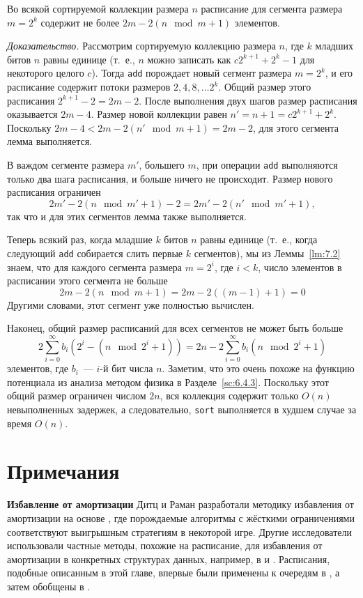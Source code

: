 \begin{lemma}\label{lm:7.2}
  Во всякой сортируемой коллекции размера $n$ расписание для сегмента
  размера $m = 2^k$ содержит не более $2m - 2(n \mod m + 1)$ элементов.

  \emph{Доказательство.} Рассмотрим сортируемую коллекцию размера $n$,
где $k$ младших битов $n$ равны единице (т.~е., $n$ можно записать как
$c2^{k+1} + 2^k -1$ для некоторого целого $c$). Тогда \lstinline!add!
порождает новый сегмент размера $m = 2^k$, и его расписание содержит
потоки размеров $2, 4, 8, \ldots 2^k$. Общий размер этого расписания
$2^{k+1} - 2 = 2m - 2$. После выполнения двух шагов размер расписания
оказывается $2m - 4$. Размер новой коллекции равен $n' = n + 1 =
c2^{k+1} + 2^k$. Поскольку $2m - 4  < 2m - 2(n' \mod m + 1) = 2m - 2$,
для этого сегмента лемма выполняется.

В важдом сегменте размера $m'$, большего $m$, при операции
\lstinline!add! выполняются только два шага
расписания, и больше ничего не происходит. Размер нового расписания
ограничен
$$
2m' - 2(n \mod m' + 1) - 2 = 2m' - 2(n' \mod m' + 1),
$$
так что и для этих сегментов лемма также выполняется.
\end{lemma}

Теперь всякий раз, когда младшие $k$ битов $n$ равны единице (т.~е.,
когда следующий \lstinline!add! собирается слить первые $k$
сегментов), мы из Леммы~\ref{lm:7.2} знаем, что для каждого сегмента
размера $m = 2^i$, где $i < k$, число элементов в расписании этого
сегмента не больше
$$
2m -2(n \mod m + 1) = 2m - 2((m-1) + 1) = 0
$$
Другими словами, этот сегмент уже полностью вычислен.

Наконец, общий размер расписаний для всех сегментов не может быть
больше
$$
2 \sum_{i=0}^\infty b_i(2^i - (n \mod 2^i + 1)) = 2n - 2 \sum_{i=0}^\infty b_i (n \mod 2^i + 1)
$$
элементов, где $b_i$~--- $i$-й бит числа $n$. Заметим, что это очень
похоже на функцию потенциала из анализа методом физика в
Разделе~\ref{sc:6.4.3}. Поскольку этот общий размер ограничен числом
$2n$, вся коллекция содержит только $O(n)$ невыполненных задержек, а
следовательно, \lstinline!sort! выполняется в худшем случае за время
$O(n)$.

\section{Примечания}
\label{sc:7.5}

\noindent
\textbf{Избавление от амортизации}
Дитц и Раман \cite{DietzRaman1991, DietzRaman1993, Raman1995}
разработали методику избавления от амортизации на основе
, где порождаемые алгоритмы с
жёсткими ограничениями соответствуют выигрышным стратегиям в некоторой
игре. Другие исследователи использовали частные методы, похожие на
расписание, для избавления от амортизации в конкретных структурах
данных, например, в  \cite{CarlssonMunroPoblete1988} и
\cite{Driscolletal1988}. Расписания, подобные описанным в этой главе,
впервые были применены к очередям в \cite{Okasaki1995c}, а затем
обобщены в \cite{Okasaki1996b}.

